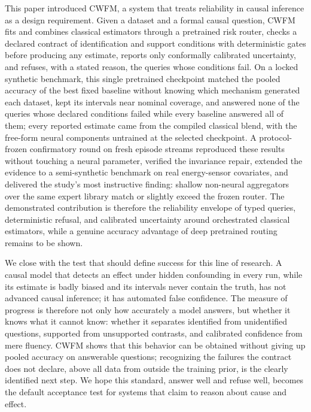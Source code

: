 \documentclass[electronics,article,submit,oneauthor]{Definitions/mdpi}
\begin{document}
This paper introduced CWFM, a system that treats reliability in causal inference as a design requirement. Given a dataset and a formal causal question, CWFM fits and combines classical estimators through a pretrained risk router, checks a declared contract of identification and support conditions with deterministic gates before producing any estimate, reports only conformally calibrated uncertainty, and refuses, with a stated reason, the queries whose conditions fail. On a locked synthetic benchmark, this single pretrained checkpoint matched the pooled accuracy of the best fixed baseline without knowing which mechanism generated each dataset, kept its intervals near nominal coverage, and answered none of the queries whose declared conditions failed while every baseline answered all of them; every reported estimate came from the compiled classical blend, with the free-form neural components untrained at the selected checkpoint. A protocol-frozen confirmatory round on fresh episode streams reproduced these results without touching a neural parameter, verified the invariance repair, extended the evidence to a semi-synthetic benchmark on real energy-sensor covariates, and delivered the study's most instructive finding: shallow non-neural aggregators over the same expert library match or slightly exceed the frozen router. The demonstrated contribution is therefore the reliability envelope of typed queries, deterministic refusal, and calibrated uncertainty around orchestrated classical estimators, while a genuine accuracy advantage of deep pretrained routing remains to be shown.

We close with the test that should define success for this line of research. A causal model that detects an effect under hidden confounding in every run, while its estimate is badly biased and its intervals never contain the truth, has not advanced causal inference; it has automated false confidence. The measure of progress is therefore not only how accurately a model answers, but whether it knows what it cannot know: whether it separates identified from unidentified questions, supported from unsupported contrasts, and calibrated confidence from mere fluency. CWFM shows that this behavior can be obtained without giving up pooled accuracy on answerable questions; recognizing the failures the contract does not declare, above all data from outside the training prior, is the clearly identified next step. We hope this standard, answer well and refuse well, becomes the default acceptance test for systems that claim to reason about cause and effect.
\end{document}
